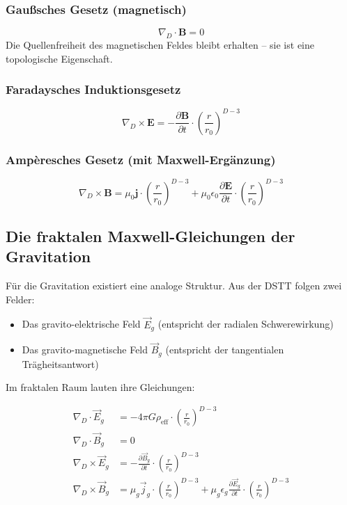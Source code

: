 \documentclass[12pt,a4paper]{article}
\begin{document}
\subsubsection{Gaußsches Gesetz (magnetisch)}
\begin{equation}
\nabla_D \cdot \mathbf{B} = 0
\end{equation}
Die Quellenfreiheit des magnetischen Feldes bleibt erhalten -- sie ist eine topologische Eigenschaft.

\subsubsection{Faradaysches Induktionsgesetz}
\begin{equation}
\nabla_D \times \mathbf{E} = -\frac{\partial \mathbf{B}}{\partial t} \cdot \left( \frac{r}{r_0} \right)^{D-3}
\end{equation}

\subsubsection{Ampèresches Gesetz (mit Maxwell-Ergänzung)}
\begin{equation}
\nabla_D \times \mathbf{B} = \mu_0 \mathbf{j} \cdot \left( \frac{r}{r_0} \right)^{D-3} + \mu_0 \epsilon_0 \frac{\partial \mathbf{E}}{\partial t} \cdot \left( \frac{r}{r_0} \right)^{D-3}
\end{equation}

\subsection{Die fraktalen Maxwell-Gleichungen der Gravitation}

Für die Gravitation existiert eine analoge Struktur. Aus der DSTT folgen zwei Felder:
\begin{itemize}
\item Das gravito-elektrische Feld $\vec{E}_g$ (entspricht der radialen Schwerewirkung)
\item Das gravito-magnetische Feld $\vec{B}_g$ (entspricht der tangentialen Trägheitsantwort)
\end{itemize}

Im fraktalen Raum lauten ihre Gleichungen:

\begin{align}
\nabla_D \cdot \vec{E}_g &= -4\pi G \rho_{\text{eff}} \cdot \left( \frac{r}{r_0} \right)^{D-3} \\
\nabla_D \cdot \vec{B}_g &= 0 \\
\nabla_D \times \vec{E}_g &= -\frac{\partial \vec{B}_g}{\partial t} \cdot \left( \frac{r}{r_0} \right)^{D-3} \\
\nabla_D \times \vec{B}_g &= \mu_g \vec{j}_g \cdot \left( \frac{r}{r_0} \right)^{D-3} + \mu_g \epsilon_g \frac{\partial \vec{E}_g}{\partial t} \cdot \left( \frac{r}{r_0} \right)^{D-3}
\end{align}
\end{document}
